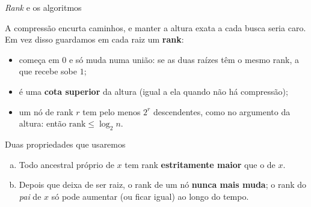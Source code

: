 \documentclass[aspectratio=169,10pt]{beamer}
\begin{document}
\begin{frame}[c]{\textit{Rank} e os algoritmos}

    \vfill
  
  A compressão encurta caminhos, e manter a altura exata a cada busca
  seria caro.  Em vez disso guardamos em cada raiz um \textbf{rank}:
  \begin{itemize}
  \item começa em $0$ e só muda numa união: se as duas raízes têm o
    mesmo rank, a que recebe sobe $1$;
  \item é uma \textbf{cota superior} da altura (igual a ela quando não
    há compressão);
  \item um nó de rank $r$ tem pelo menos $2^r$ descendentes, como no
    argumento da altura: então $\mathrm{rank}\leq\log_2n$.
  \end{itemize}


  \vfill
  
  \begin{block}{Duas propriedades que usaremos}
    \begin{enumerate}[(a)]
    \item Todo ancestral próprio de $x$ tem rank \textbf{estritamente
        maior} que o de $x$.
    \item Depois que deixa de ser raiz, o rank de um nó \textbf{nunca
        mais muda}; o rank do \textit{pai} de $x$ só pode aumentar
      (ou ficar igual) ao longo do tempo.
    \end{enumerate}
  \end{block}
  
    \vfill
 \end{frame}
\end{document}
